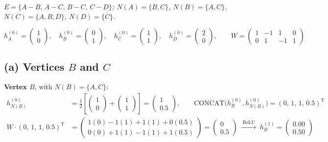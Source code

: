 \documentclass[11pt]{article}
\newcommand{\figdata}[1]{%
  \par\vspace{-0.6em}%
  {\centering\small\textit{#1}\par}%
  \vspace{0.4em}}
\begin{document}
\begin{center}
\end{center}
\figdata{$E=\{A{-}B,\,A{-}C,\,B{-}C,\,C{-}D\}$;\quad
$N(A)=\{B,C\}$, $N(B)=\{A,C\}$, $N(C)=\{A,B,D\}$, $N(D)=\{C\}$.}

\[
  h_A^{(0)}=\begin{pmatrix}1\\0\end{pmatrix},\quad
  h_B^{(0)}=\begin{pmatrix}0\\1\end{pmatrix},\quad
  h_C^{(0)}=\begin{pmatrix}1\\1\end{pmatrix},\quad
  h_D^{(0)}=\begin{pmatrix}2\\0\end{pmatrix},\qquad
  W=\begin{pmatrix}1&-1&1&0\\0&1&-1&1\end{pmatrix}
\]

\subsection*{(a) Vertices $B$ and $C$}

\noindent\textbf{Vertex $B$}, with $N(B)=\{A,C\}$:
\begin{align*}
  h_{N(B)}^{(0)} &= \tfrac12\left[\begin{pmatrix}1\\0\end{pmatrix}
                  + \begin{pmatrix}1\\1\end{pmatrix}\right]
                  = \begin{pmatrix}1\\[2pt] 0.5\end{pmatrix},\qquad
  \mathrm{CONCAT}\bigl(h_B^{(0)},h_{N(B)}^{(0)}\bigr)
                  = (0,\,1,\,1,\,0.5)^{\mathsf T}\\[4pt]
  W\cdot(0,\,1,\,1,\,0.5)^{\mathsf T}
    &= \begin{pmatrix} 1(0)-1(1)+1(1)+0(0.5)\\[2pt] 0(0)+1(1)-1(1)+1(0.5)\end{pmatrix}
     = \begin{pmatrix}0\\[2pt]0.5\end{pmatrix}
  \;\xrightarrow{\ \mathrm{ReLU}\ }\;
  h_B^{(1)}=\begin{pmatrix}0.00\\[2pt]0.50\end{pmatrix}
\end{align*}
\end{document}
